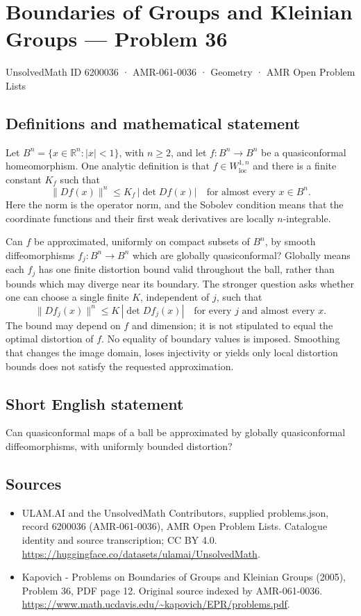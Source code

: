 \documentclass[11pt,a4paper]{article}
\begin{document}
\section*{Boundaries of Groups and Kleinian Groups — Problem 36}\label{6200036}
{\small UnsolvedMath ID 6200036 · AMR-061-0036 · Geometry · AMR Open Problem Lists}
\subsection{Definitions and mathematical statement}
Let $B^n=\{x\in\mathbb R^n:|x|<1\}$, with $n\geq2$, and let $f:B^n\to B^n$ be a quasiconformal homeomorphism. One analytic definition is that $f\in W^{1,n}_{\mathrm{loc}}$ and there is a finite constant $K_f$ such that
\[
 \lVert Df(x)\rVert^n\leq K_f\,|\det Df(x)|
 \quad\text{for almost every }x\in B^n.
\]
Here the norm is the operator norm, and the Sobolev condition means that the coordinate functions and their first weak derivatives are locally $n$-integrable.

Can $f$ be approximated, uniformly on compact subsets of $B^n$, by smooth diffeomorphisms $f_j:B^n\to B^n$ which are globally quasiconformal? Globally means each $f_j$ has one finite distortion bound valid throughout the ball, rather than bounds which may diverge near its boundary. The stronger question asks whether one can choose a single finite $K$, independent of $j$, such that
\[
 \lVert Df_j(x)\rVert^n\leq K\,|\det Df_j(x)|
 \quad\text{for every }j\text{ and almost every }x.
\]
The bound may depend on $f$ and dimension; it is not stipulated to equal the optimal distortion of $f$. No equality of boundary values is imposed. Smoothing that changes the image domain, loses injectivity or yields only local distortion bounds does not satisfy the requested approximation.
\subsection{Short English statement}
Can quasiconformal maps of a ball be approximated by globally quasiconformal diffeomorphisms, with uniformly bounded distortion?
\subsection{Sources}
\begin{itemize}
\item[S1] ULAM.AI and the UnsolvedMath Contributors, supplied problems.json, record 6200036 (AMR-061-0036), AMR Open Problem Lists. Catalogue identity and source transcription; CC BY 4.0.
\url{https://huggingface.co/datasets/ulamai/UnsolvedMath}.
\item[S2] Kapovich - Problems on Boundaries of Groups and Kleinian Groups (2005), Problem 36, PDF page 12. Original source indexed by AMR-061-0036.
\url{https://www.math.ucdavis.edu/~kapovich/EPR/problems.pdf}.
\end{itemize}
\end{document}

